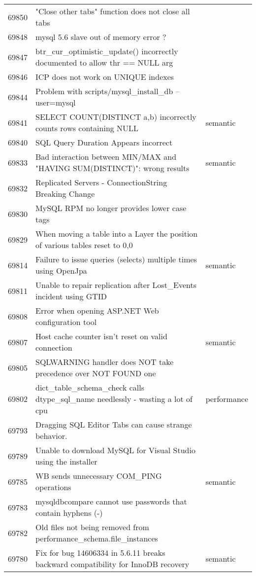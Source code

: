 \begin{longtable}[c]{p{1cm}p{10cm}p{1cm}}
69850 & "Close other tabs" function does not close all tabs &  \\
69848 & mysql 5.6 slave out of memory error ? &  \\
69847 & btr\_cur\_optimistic\_update() incorrectly documented to allow thr == NULL arg &  \\
69846 & ICP does not work on UNIQUE indexes &  \\
69844 & Problem with scripts/mysql\_install\_db --user=mysql &  \\
69841 & SELECT COUNT(DISTINCT a,b) incorrectly counts rows containing NULL & semantic \\
69840 & SQL Query Duration Appears incorrect &  \\
69833 & Bad interaction between MIN/MAX and "HAVING SUM(DISTINCT)": wrong results & semantic \\
69832 & Replicated Servers - ConnectionString Breaking Change &  \\
69830 & MySQL RPM no longer provides lower case tags &  \\
69829 & When moving a table into a Layer the position of various tables reset to 0,0 &  \\
69814 & Failure to issue queries (selects) multiple times using OpenJpa & semantic \\
69811 & Unable to repair replication after Lost\_Events incident using GTID &  \\
69808 & Error when opening ASP.NET Web configuration tool &  \\
69807 & Host cache counter isn't reset on valid connection & semantic \\
69805 & SQLWARNING handler does NOT take precedence over NOT FOUND one &  \\
69802 & dict\_table\_schema\_check calls dtype\_sql\_name needlessly - wasting a lot of cpu & performance \\
69793 & Dragging SQL Editor Tabs can cause strange behavior. &  \\
69789 & Unable to download MySQL for Visual Studio using the installer &  \\
69785 & WB sends unnecessary COM\_PING operations & semantic \\
69783 & mysqldbcompare cannot use passwords that contain hyphens (-) &  \\
69782 & Old files not being removed from performance\_schema.file\_instances &  \\
69780 & Fix for bug 14606334 in 5.6.11 breaks backward compatibility for InnoDB recovery & semantic \\

\end{longtable}

